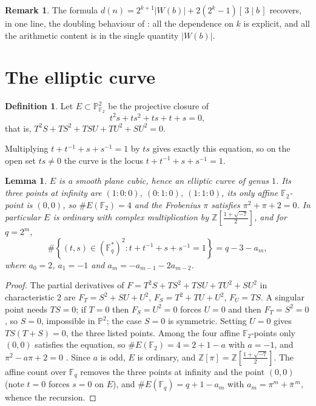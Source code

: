 \documentclass[a4paper]{article}
\newtheorem{lemma}[theorem]{Lemma}
\theoremstyle{definition}
\newtheorem{definition}[theorem]{Definition}
\newtheorem{remark}[theorem]{Remark}
\newcommand{\Z}{\mathbb{Z}}
\newcommand{\F}{\mathbb{F}}
\newcommand{\abs}[1]{\left| #1 \right|}
\begin{document}
	\begin{remark}
		The formula $d(n) = 2^{k+1}\abs{W(b)} + 2(2^k-1)[\,3\mid b\,]$ recovers, in one line, the doubling behaviour of \cite{HUNZIKER2004465, Boyles2022}: all the dependence on $k$ is explicit, and all the arithmetic content is in the single quantity $\abs{W(b)}$.
	\end{remark}

	\section{The elliptic curve}\label{sec:curve}
	\begin{definition}
		Let $E \subset \mathbb{P}^2_{\F_2}$ be the projective closure of
		\begin{equation*}
			t^2 s + t s^2 + ts + t + s = 0,
		\end{equation*}
		that is, $T^2 S + T S^2 + TSU + TU^2 + SU^2 = 0$.
	\end{definition}
	Multiplying $t + t^{-1} + s + s^{-1} = 1$ by $ts$ gives exactly this equation, so on the open set $ts \neq 0$ the curve is the locus $t + t^{-1} + s + s^{-1} = 1$.

	\begin{lemma}\label{lem:E}
		$E$ is a smooth plane cubic, hence an elliptic curve of genus $1$.
		Its three points at infinity are $(1:0:0)$, $(0:1:0)$, $(1:1:0)$, its only affine $\F_2$-point is $(0,0)$, so $\#E(\F_2) = 4$ and the Frobenius $\pi$ satisfies $\pi^2 + \pi + 2 = 0$.
		In particular $E$ is ordinary with complex multiplication by $\Z\!\left[\frac{1+\sqrt{-7}}{2}\right]$, and for $q = 2^m$,
		\begin{equation*}
			\#\left\{(t,s) \in (\F_q^*)^2 : t + t^{-1} + s + s^{-1} = 1 \right\} = q - 3 - a_m,
		\end{equation*}
		where $a_0 = 2$, $a_1 = -1$ and $a_m = -a_{m-1} - 2 a_{m-2}$.
	\end{lemma}
	\begin{proof}
		The partial derivatives of $F = T^2S + TS^2 + TSU + TU^2 + SU^2$ in characteristic $2$ are
		$F_T = S^2 + SU + U^2$, $F_S = T^2 + TU + U^2$, $F_U = TS$.
		A singular point needs $TS = 0$; if $T = 0$ then $F_S = U^2 = 0$ forces $U = 0$ and then $F_T = S^2 = 0$, so $S = 0$, impossible in $\mathbb{P}^2$; the case $S = 0$ is symmetric.
		Setting $U = 0$ gives $TS(T+S) = 0$, the three listed points.
		Among the four affine $\F_2$-points only $(0,0)$ satisfies the equation, so $\#E(\F_2) = 4 = 2 + 1 - a$ with $a = -1$, and $\pi^2 - a\pi + 2 = 0$ \cite{Silverman2009}.
		Since $a$ is odd, $E$ is ordinary, and $\Z[\pi] = \Z\!\left[\frac{1+\sqrt{-7}}{2}\right]$.
		The affine count over $\F_q$ removes the three points at infinity and the point $(0,0)$ (note $t = 0$ forces $s = 0$ on $E$), and $\#E(\F_q) = q + 1 - a_m$ with $a_m = \pi^m + \bar\pi^{\,m}$, whence the recursion.
	\end{proof}
\end{document}
